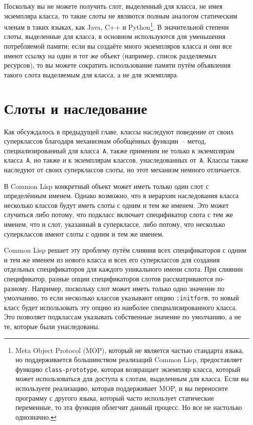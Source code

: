 Поскольку вы не можете получить слот, выделенный для класса, не имея экземпляра класса, то
такие слоты не являются полным аналогом статическим членам в таких языках, как Java, C++ и
Python\footnote{Meta Object Protocol (MOP), который не является частью стандарта языка,
  но поддерживается большинством реализаций Common Lisp, предоставляет функцию
  \lstinline{class-prototype}, которая возвращает экземпляр класса, который может
  использоваться для доступа к слотам, выделенным для класса.  Если вы используете
  реализацию, которая поддерживает MOP, и вы переносите программу с другого языка, который
  часто использует статические переменные, то эта функция облегчит данный процесс.  Но все
  не настолько однозначно.}.  В значительной степени слоты, выделенные для класса, в
основном используются для уменьшения потребляемой памяти; если вы создаёте много
экземпляров класса и они все имеют ссылку на один и тот же объект (например, список
разделяемых ресурсов), то вы можете сократить использование памяти путём объявления такого
слота выделяемым для класса, а не для экземпляра.

\section{Слоты и наследование}

Как обсуждалось в предыдущей главе, классы наследуют поведение от своих суперклассов
благодаря механизмам обобщённых функции~-- метод, специализированный для класса~\lstinline{A},
также применим не только к экземплярам класса~\lstinline{A}, но также и к экземплярам классов,
унаследованных от~\lstinline{A}.  Классы также наследуют от своих суперклассов слоты, но этот
механизм немного отличается.

В Common Lisp конкретный объект может иметь только один слот с определённым именем.
Однако возможно, что в иерархии наследования класса несколько классов будут иметь слоты с
одним и тем же именем.  Это может случиться либо потому, что подкласс включает
спецификатор слота с тем же именем, что и слот, указанный в суперклассе, либо потому, что
несколько суперклассов имеют слоты с одним и тем же именем.

Common Lisp решает эту проблему путём слияния всех спецификаторов с одним и тем же именем
из нового класса и всех его суперклассов для создания отдельных спецификаторов для каждого
уникального имени слота.  При слиянии спецификатор, разные опции спецификаторов слотов
рассматриваются по-разному.  Например, поскольку слот может иметь только одно значение по
умолчанию, то если несколько классов указывают опцию \lstinline{:initform}, то новый класс
будет использовать эту опцию из наиболее специализированного класса.  Это позволяет
подклассам указывать собственные значение по умолчанию, а не те, которые были
унаследованы.

